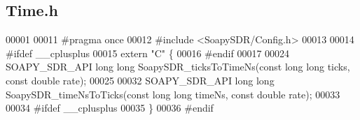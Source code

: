 \subsection{Time.\+h}
\label{Time_8h_source}

\begin{DoxyCode}
00001 
00011 \textcolor{preprocessor}{#pragma once}
00012 \textcolor{preprocessor}{#include <SoapySDR/Config.h>}
00013 
00014 \textcolor{preprocessor}{#ifdef \_\_cplusplus}
00015 \textcolor{keyword}{extern} \textcolor{stringliteral}{"C"} \{
00016 \textcolor{preprocessor}{#endif}
00017 
00024 SOAPY_SDR_API \textcolor{keywordtype}{long} \textcolor{keywordtype}{long} SoapySDR_ticksToTimeNs(\textcolor{keyword}{const} \textcolor{keywordtype}{long} \textcolor{keywordtype}{long} ticks, \textcolor{keyword}{const} \textcolor{keywordtype}{double} 
      rate);
00025 
00032 SOAPY_SDR_API \textcolor{keywordtype}{long} \textcolor{keywordtype}{long} SoapySDR_timeNsToTicks(\textcolor{keyword}{const} \textcolor{keywordtype}{long} \textcolor{keywordtype}{long} timeNs, \textcolor{keyword}{const} \textcolor{keywordtype}{double} 
      rate);
00033 
00034 \textcolor{preprocessor}{#ifdef \_\_cplusplus}
00035 \}
00036 \textcolor{preprocessor}{#endif}
\end{DoxyCode}
